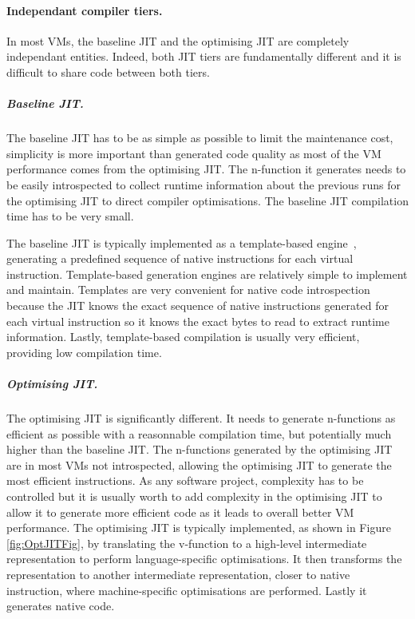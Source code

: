 \documentclass[a4paper,12pt,twoside]{../includes/ThesisStyle}
\begin{document}
\paragraph{Independant compiler tiers.}
In most VMs, the baseline JIT and the optimising JIT are completely independant entities. Indeed, both JIT tiers are fundamentally different and it is difficult to share code between both tiers. 

\subparagraph{Baseline JIT.} The baseline JIT has to be as simple as possible to limit the maintenance cost, simplicity is more important than generated code quality as most of the VM performance comes from the optimising JIT. The n-function it generates needs to be easily introspected to collect runtime information about the previous runs for the optimising JIT to direct compiler optimisations. The baseline JIT compilation time has to be very small.

The baseline JIT is typically implemented as a template-based engine~\cite{Deut84a}, generating a predefined sequence of native instructions for each virtual instruction. Template-based generation engines are relatively simple to implement and maintain. Templates are very convenient for native code introspection because the JIT knows the exact sequence of native instructions generated for each virtual instruction so it knows the exact bytes to read to extract runtime information. Lastly, template-based compilation is usually very efficient, providing low compilation time.

\subparagraph{Optimising JIT.} The optimising JIT is significantly different. It needs to generate n-functions as efficient as possible with a reasonnable compilation time, but potentially much higher than the baseline JIT. The n-functions generated by the optimising JIT are in most VMs not introspected, allowing the optimising JIT to generate the most efficient instructions. As any software project, complexity has to be controlled but it is usually worth to add complexity in the optimising JIT to allow it to generate more efficient code as it leads to overall better VM performance. The optimising JIT is typically implemented, as shown in Figure \ref{fig:OptJITFig}, by translating the v-function to a high-level intermediate representation to perform language-specific optimisations. It then transforms the representation to another intermediate representation, closer to native instruction, where machine-specific optimisations are performed. Lastly it generates native code.
\end{document}
